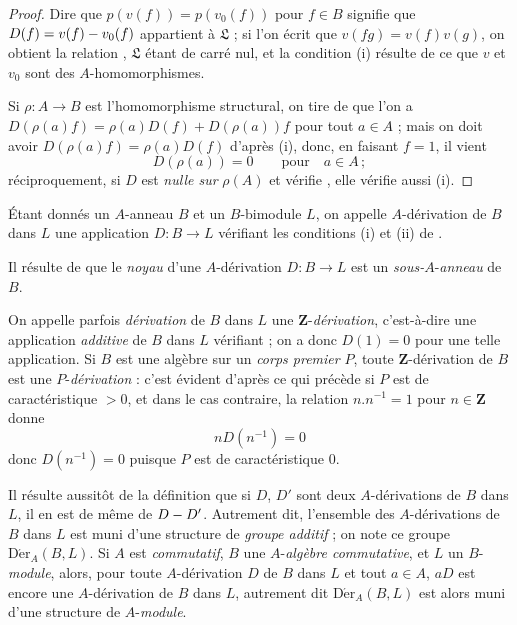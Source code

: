 \begin{proof}
Dire que $p(v(f))=p(v_0(f))$ pour $f\in B$ signifie que
$D(f)=v(f)- v_0(f)$ appartient à $\mathfrak{L}$ ; si l'on écrit que
$v(fg)=v(f)v(g)$, on obtient la relation ,
$\mathfrak{L}$ étant de carré nul, et la condition (i) résulte de ce que $v$
et $v_0$ sont des $A$-homomorphismes.

Si $\rho:A\to B$ est l'homomorphisme structural, on tire de
 que l'on a
$D(\rho(a)f)=\rho(a)D(f)+D(\rho(a))f$ pour tout $a\in A$ ; mais on doit
avoir $D(\rho(a)f)=\rho(a)D(f)$ d'après (i), donc, en faisant $f=1$, il
vient
\[
  D(\rho(a))=0 \qquad\text{pour}\quad a\in A\,;
\]
réciproquement, si $D$ est \emph{nulle sur} $\rho(A)$ et vérifie
, elle vérifie aussi (i).
\end{proof}

\begin{definition}[20.1.2]
\label{0.20.1.2-fr}
Étant donnés un $A$-anneau $B$ et un $B$-bimodule $L$, on appelle
$A$-dérivation de $B$ dans $L$ une application $D:B\to L$ vérifiant
les conditions \textup{(i)} et \textup{(ii)} de \textup{}.
\end{definition}

Il résulte de  que le \emph{noyau} d'une $A$-dérivation
$D:B\to L$ est un \emph{sous-}$A$-\emph{anneau} de $B$.

On appelle parfois \emph{dérivation} de $B$ dans $L$ une
$\mathbf{Z}$-\emph{dérivation}, c'est-à-dire une application \emph{additive} de $B$
dans $L$ vérifiant  ; on a donc $D(1)=0$ pour une telle
application. Si $B$ est une algèbre sur un \emph{corps premier} $P$, toute
$\mathbf{Z}$-dérivation de $B$ est une $P$-\emph{dérivation} : c'est évident d'après
ce qui précède si $P$ est de caractéristique $>0$, et dans le cas contraire,
la relation $n.n^{-1}=1$ pour $n\in\mathbf{Z}$ donne
\[
  nD(n^{-1})=0
\]
donc $D(n^{-1})=0$ puisque $P$ est de caractéristique $0$.

Il résulte aussitôt de la définition  que si $D$, $D'$ sont
deux $A$-dérivations de $B$ dans $L$, il en est de même de $D- D'$. Autrement
dit, l'ensemble des $A$-dérivations de $B$ dans $L$ est muni d'une structure
de \emph{groupe additif} ; on note ce groupe
$\operatorname{D\acute{e}r}_A(B,L)$. Si $A$ est \emph{commutatif}, $B$ une
$A$-\emph{algèbre commutative}, et $L$ un $B$-\emph{module}, alors, pour toute
$A$-dérivation $D$ de $B$ dans $L$ et tout $a\in A$, $aD$ est encore une
$A$-dérivation de $B$ dans $L$, autrement dit $\operatorname{D\acute{e}r}_A(B,L)$
est alors muni d'une structure de $A$-\emph{module}.

